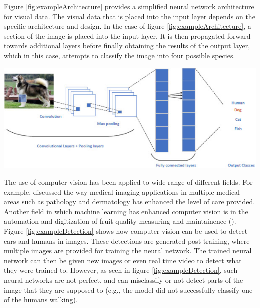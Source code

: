\documentclass[man]{apa7}
\begin{document}
Figure \ref{fig:exampleArchitecture} provides a simplified neural network architecture for visual data. The visual data that is placed into the input layer depends on the specific architecture and design. In the case of figure \ref{fig:exampleArchitecture}, a section of the image is placed into the input layer. It is then propagated forward towards additional layers before finally obtaining the results of the output layer, which in this case, attempts to classify the image into four possible species.

\begin{minipage}{\linewidth}
  \includegraphics[height=\textheight/4 ,width=\textwidth/1]{figures/exampleML.jpg}
  \label{fig:exampleArchitecture}
\end{minipage}

The use of computer vision has been applied to wide range of different fields. For example, \textcite{MEDICAL} discussed the way medical imaging applications in multiple medical areas such as pathology and dermatology has enhanced the level of care provided. Another field in which machine learning has enhanced computer vision is in the automation and digitization of fruit quality measuring and maintainence (\textcite{SUPERMARKET}). Figure \ref{fig:exampleDetection} shows how computer vision can be used to detect cars and humans in images. These detections are generated post-training, where multiple images are provided for training the neural network. The trained neural network can then be given new images or even real time video to detect what they were trained to. However, as seen in figure \ref{fig:exampleDetection}, such neural networks are not perfect, and can misclassify or not detect parts of the image that they are supposed to (e.g., the model did not successfully classify one of the humans walking).

\newpage
\end{document}
